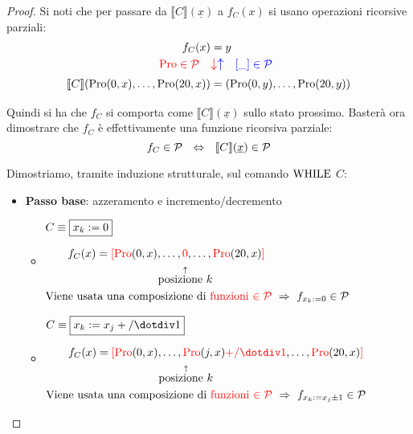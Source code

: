 \begin{proof}
    Si noti che per passare da $\llbracket C \rrbracket (\underline{x})$ a $f_C(x)$ 
	si usano operazioni ricorsive parziali:
	$$\begin{aligned}
		f_C(x)&=y \\
		{\color{red}\pro \in \cp}\quad &
		\mathlarger{{\color{red}\downarrow}{\color{blue}\uparrow}}
		\quad\color{blue} [ \_ ] \in \cp \\
		\llbracket C \rrbracket (\pro(0,x),\dots,\pro(20,x))& =(\pro(0,y),\dots,\pro(20,y))
	\end{aligned}$$
	
	Quindi si ha che $f_C$ si comporta come $\llbracket C \rrbracket (\underline{x})$ sullo stato prossimo. Basterà ora dimostrare che $f_C$ è effettivamente una funzione ricorsiva parziale:
	$$ f_C\in \mathcal{P} \ \ \Leftrightarrow \ \ \llbracket C \rrbracket (\underline{x}) \in \mathcal{P} $$
	
    Dimostriamo, tramite induzione strutturale, sul comando $\text{WHILE}$ $C$:
	\begin{itemize}
		\item \textbf{Passo base}: azzeramento e incremento/decremento
		\begin{itemize}
			\renewcommand{\labelitemii}{\raisebox{5.2\height}{$-$}}
			\item $\begin{aligned}
				&C\equiv \boxed{x_k:=0} \\[.6em]
				&\hspace{2em}f_C(x) = {\color{red}[}
				{\color{red}\pro}(0,x),\dots,{\color{red}0},\dots,{\color{red}\pro}
				(20,x){\color{red}]}\\
				&\hspace{10.05em}\overset{\uparrow}{\text{posizione $k$}}\\
				& \text{Viene usata una composizione di {\color{red}funzioni 
						$\in\cp$}}
				\ \Rightarrow \ f_{x_k:=0}\in\cp
			\end{aligned}$
			\renewcommand{\labelitemii}{\raisebox{5.2\height}{$-$}}
			\item $\begin{aligned}
				&C\equiv \boxed{x_k:=x_j+/\dotminus 1}\\[.6em]
				&\hspace{2em}f_C(x) = {\color{red}[}
				{\color{red}\pro}(0,x),\dots,
				{\color{red}\pro}(j,x){\color{red}+/\dotminus 1}
				,\dots,{\color{red}\pro}
				(20,x){\color{red}]}\\
				&\hspace{10.05em}\overset{\uparrow}{\text{posizione $k$}}\\
				& \text{Viene usata una composizione di {\color{red}funzioni 
						$\in\cp$}}
				\ \Rightarrow \ f_{x_k:=x_j\pm1}\in\cp
			\end{aligned}$
		\end{itemize}


\end{itemize}
\end{proof}
